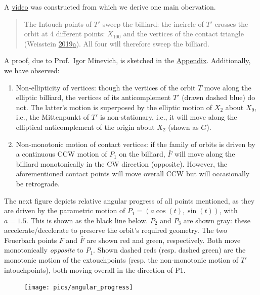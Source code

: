 \documentclass[]{article}
\providecommand{\tightlist}{%
  \setlength{\itemsep}{0pt}\setlength{\parskip}{0pt}}
\begin{document}
A \href{https://youtu.be/18RyUdh8qLk}{video} was constructed from which we derive one main obervation.

\begin{quote}
The Intouch points of \(T'\) sweep the billiard: the incircle of \(T'\) crosses the orbit at 4 different points: \(X_{100}\) and the vertices of the contact triangle (Weisstein \protect\hyperlink{ref-mw}{2019}\protect\hyperlink{ref-mw}{a}). All four will therefore sweep the billiard.
\end{quote}

A proof, due to Prof.~Igor Minevich, is sketched in the \href{appendices.html}{Appendix}. Additionally, we have observed:

\begin{enumerate}
\def\labelenumi{\alph{enumi}.}
\tightlist
\item
  Non-ellipticity of vertices: though the vertices of the orbit \(T\) move along the elliptic billiard, the vertices of its anticomplement \(T'\) (drawn dashed blue) do not. The latter's motion is superposed by the elliptic motion of \(X_2\) about \(X_9\), i.e., the Mittenpunkt of \(T'\) is non-stationary, i.e., it will move along the elliptical anticomplement of the origin about \(X_2\) (shown as \(G\)).
\item
  Non-monotonic motion of contact vertices: if the family of orbits is driven by a continuous CCW motion of \(P_1\) on the billiard, \(\bar{F}\) will move along the billiard monotonically in the CW direction (opposite). However, the aforementioned contact points will move overall CCW but will occasionally be retrograde.
\end{enumerate}

The next figure depicts relative angular progress of all points mentioned, as they are driven by the parametric motion of \(P_1 = (a \cos(t), \sin(t))\), with \(a=1.5\). This is shown as the black line below. \(P_2\) and \(P_3\) are shown gray: these accelerate/decelerate to preserve the orbit's required geometry. The two Feuerbach points \(F\) and \(\bar{F}\) are shown red and green, respectively. Both move monotonically \emph{opposite} to \(P_1\). Shown dashed reds (resp. dashed green) are the monotonic motion of the extouchpoints (resp. the non-monotonic motion of \(T'\) intouchpoints), both moving overall in the direction of P1.

\begin{figure}[H]

{\centering \texttt{[image: pics/angular\_progress]} 

}

\end{figure}
\end{document}
